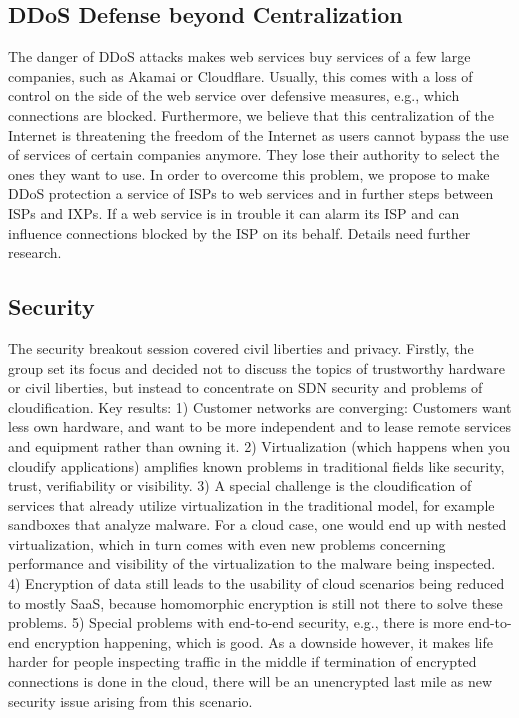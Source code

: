 \subsection{DDoS Defense beyond Centralization}

The danger of \ac{DDoS} attacks makes web services buy services of a few large
companies, such as Akamai or Cloudflare. Usually, this comes with a loss of
control on the side of the web service over defensive measures, e.g., which
connections are blocked.
Furthermore, we believe that this centralization of the
Internet is threatening the freedom of the Internet as users cannot bypass the
use of services of certain companies anymore. They lose their authority to
select the ones they want to use. In order to overcome this problem, we propose to
make \ac{DDoS} protection a service of ISPs to web services and in further
steps between ISPs and IXPs. If a web service is in trouble it can alarm its
ISP and can influence connections blocked by the ISP on its behalf. Details
need further research.

\subsection{Security}

The security breakout session covered civil liberties and privacy. Firstly,
the group set its focus and decided not to discuss the topics of trustworthy
hardware or civil liberties, but instead to concentrate on \ac{SDN} security
and problems of cloudification. Key results: 1) Customer networks are
converging:  Customers want less own hardware, and want to be more independent
and to lease remote services and equipment rather than owning it.  2)
Virtualization (which happens when you cloudify applications) amplifies known
problems in traditional fields like security, trust, verifiability or
visibility.  3) A special challenge is the cloudification of services that
already utilize virtualization in the traditional model, for example sandboxes
that analyze malware.  For a cloud case, one would end up with nested
virtualization, which in turn comes with even new problems concerning
performance and visibility of the virtualization to the malware being
inspected. 4) Encryption of data still leads to the usability of cloud
scenarios being reduced to mostly SaaS, because homomorphic encryption is
still not there to solve these problems. 5) Special problems with end-to-end
security, e.g., there is more end-to-end encryption happening, which is good.
As a downside however, it makes life harder for people inspecting traffic in
the middle if termination of encrypted connections is done in the cloud, there
will be an unencrypted last mile as new security issue arising from this
scenario.

